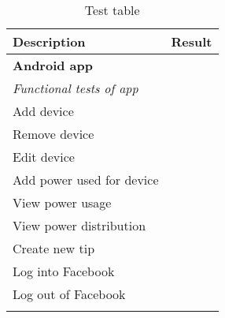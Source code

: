 \begin{table}[H]
\centering
{}
\begin{tabular}{|l|l|}
\hline
\rowcolor{darkgray} \textbf{Description} & \textbf{Result}\\\hline \arrayrulecolor{lightgray}
\textbf{Android app}&\\ \cline{1-2}\cline{2-3}
\textit{Functional tests of app} &  \\ \cline{1-2}\cline{2-3}
Add device&\\ \cline{1-2}\cline{2-3}
Remove device&\\ \cline{1-2}\cline{2-3}
Edit device&\\ \cline{1-2}\cline{2-3}
Add power used for device&\\ \cline{1-2}\cline{2-3}
View power usage&\\ \cline{1-2}\cline{2-3}
View power distribution&\\ \cline{1-2}\cline{2-3}
Create new tip&\\ \cline{1-2}\cline{2-3}
Log into Facebook&\\ \cline{1-2}\cline{2-3}
Log out of Facebook&\\\arrayrulecolor{black}
\hline
\end{tabular}
\caption{Test table}
\label{tab:testTable}
\end{table}
